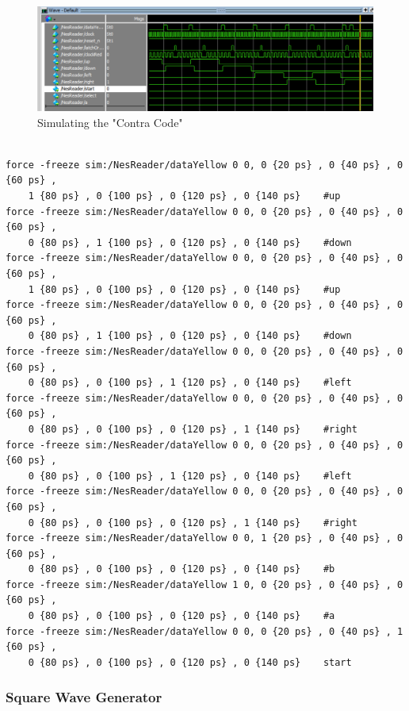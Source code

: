 \documentclass[a4paper]{article}
\begin{document}
\begin{figure}[H]
    \includegraphics[width=0.8 \linewidth]{images/NESSIMcontra.png}
    \caption{Simulating the "Contra Code" }
    \label{contraSim}
\end{figure}

\begin{verbatim}

force -freeze sim:/NesReader/dataYellow 0 0, 0 {20 ps} , 0 {40 ps} , 0 {60 ps} , 
    1 {80 ps} , 0 {100 ps} , 0 {120 ps} , 0 {140 ps}	#up
force -freeze sim:/NesReader/dataYellow 0 0, 0 {20 ps} , 0 {40 ps} , 0 {60 ps} , 
    0 {80 ps} , 1 {100 ps} , 0 {120 ps} , 0 {140 ps}	#down
force -freeze sim:/NesReader/dataYellow 0 0, 0 {20 ps} , 0 {40 ps} , 0 {60 ps} , 
    1 {80 ps} , 0 {100 ps} , 0 {120 ps} , 0 {140 ps}	#up
force -freeze sim:/NesReader/dataYellow 0 0, 0 {20 ps} , 0 {40 ps} , 0 {60 ps} , 
    0 {80 ps} , 1 {100 ps} , 0 {120 ps} , 0 {140 ps}	#down
force -freeze sim:/NesReader/dataYellow 0 0, 0 {20 ps} , 0 {40 ps} , 0 {60 ps} , 
    0 {80 ps} , 0 {100 ps} , 1 {120 ps} , 0 {140 ps}	#left
force -freeze sim:/NesReader/dataYellow 0 0, 0 {20 ps} , 0 {40 ps} , 0 {60 ps} , 
    0 {80 ps} , 0 {100 ps} , 0 {120 ps} , 1 {140 ps}	#right
force -freeze sim:/NesReader/dataYellow 0 0, 0 {20 ps} , 0 {40 ps} , 0 {60 ps} , 
    0 {80 ps} , 0 {100 ps} , 1 {120 ps} , 0 {140 ps}	#left
force -freeze sim:/NesReader/dataYellow 0 0, 0 {20 ps} , 0 {40 ps} , 0 {60 ps} , 
    0 {80 ps} , 0 {100 ps} , 0 {120 ps} , 1 {140 ps}	#right
force -freeze sim:/NesReader/dataYellow 0 0, 1 {20 ps} , 0 {40 ps} , 0 {60 ps} , 
    0 {80 ps} , 0 {100 ps} , 0 {120 ps} , 0 {140 ps}	#b	
force -freeze sim:/NesReader/dataYellow 1 0, 0 {20 ps} , 0 {40 ps} , 0 {60 ps} , 
    0 {80 ps} , 0 {100 ps} , 0 {120 ps} , 0 {140 ps}	#a
force -freeze sim:/NesReader/dataYellow 0 0, 0 {20 ps} , 0 {40 ps} , 1 {60 ps} , 
    0 {80 ps} , 0 {100 ps} , 0 {120 ps} , 0 {140 ps}	start
\end{verbatim}

\subsubsection{Square Wave Generator}
\end{document}
